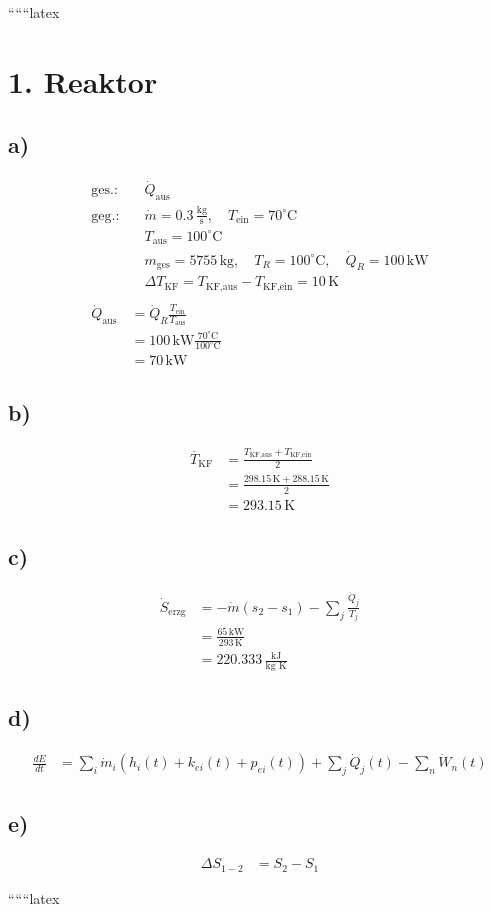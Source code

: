 
``````latex

\section*{1. Reaktor}

\subsection*{a)}
\begin{align*}
\text{ges.:} & \quad \dot{Q}_{\text{aus}} \\
\text{geg.:} & \quad \dot{m} = 0.3 \, \frac{\text{kg}}{\text{s}}, \quad T_{\text{ein}} = 70^\circ \text{C} \\
& \quad T_{\text{aus}} = 100^\circ \text{C} \\
& \quad m_{\text{ges}} = 5755 \, \text{kg}, \quad T_R = 100^\circ \text{C}, \quad \dot{Q}_R = 100 \, \text{kW} \\
& \quad \Delta T_{\text{KF}} = T_{\text{KF,aus}} - T_{\text{KF,ein}} = 10 \, \text{K} \\
\\
\dot{Q}_{\text{aus}} & = \dot{Q}_R \frac{T_{\text{ein}}}{T_{\text{aus}}} \\
& = 100 \, \text{kW} \frac{70^\circ \text{C}}{100^\circ \text{C}} \\
& = 70 \, \text{kW}
\end{align*}

\subsection*{b)}
\begin{align*}
\overline{T}_{\text{KF}} & = \frac{T_{\text{KF,aus}} + T_{\text{KF,ein}}}{2} \\
& = \frac{298.15 \, \text{K} + 288.15 \, \text{K}}{2} \\
& = 293.15 \, \text{K}
\end{align*}

\subsection*{c)}
\begin{align*}
\dot{S}_{\text{erzg}} & = -\dot{m} (s_2 - s_1) - \sum_j \frac{\dot{Q}_j}{T_j} \\
& = \frac{65 \, \text{kW}}{293 \, \text{K}} \\
& = 220.333 \, \frac{\text{kJ}}{\text{kg K}}
\end{align*}

\subsection*{d)}
\begin{align*}
\frac{dE}{dt} & = \sum_i \dot{m}_i (h_i(t) + k_{ei}(t) + p_{ei}(t)) + \sum_j \dot{Q}_j(t) - \sum_n \dot{W}_n(t)
\end{align*}

\subsection*{e)}
\begin{align*}
\Delta S_{1-2} & = S_2 - S_1
\end{align*}

``````latex


